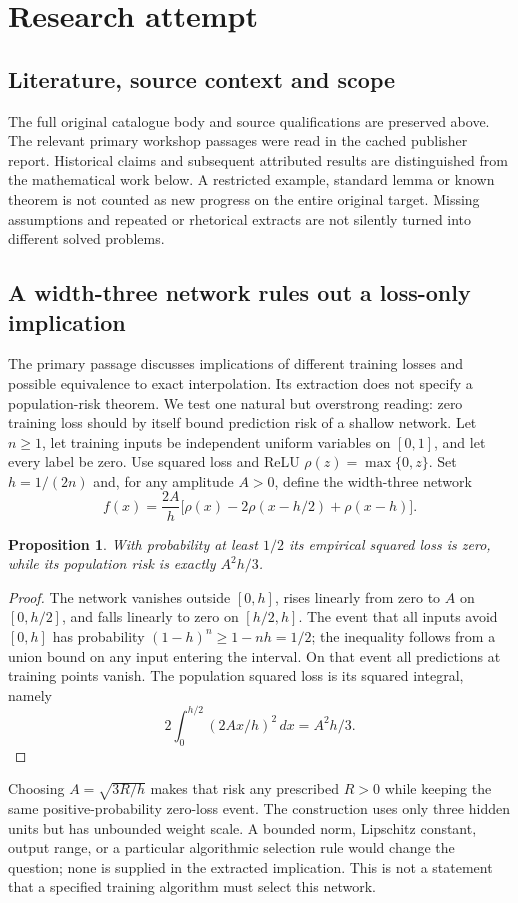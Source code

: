 \documentclass[11pt]{article}
\newtheorem{proposition}{Proposition}
\begin{document}
\section{Research attempt}
\subsection{Literature, source context and scope}
The full original catalogue body and source qualifications are preserved above. The relevant primary workshop passages were read in the cached publisher report. Historical claims and subsequent attributed results are distinguished from the mathematical work below. A restricted example, standard lemma or known theorem is not counted as new progress on the entire original target. Missing assumptions and repeated or rhetorical extracts are not silently turned into different solved problems.

\subsection{A width-three network rules out a loss-only implication}
The primary passage discusses implications of different training losses and possible equivalence to exact interpolation. Its extraction does not specify a population-risk theorem. We test one natural but overstrong reading: zero training loss should by itself bound prediction risk of a shallow network.
Let $n\ge1$, let training inputs be independent uniform variables on $[0,1]$, and let every label be zero. Use squared loss and ReLU $\rho(z)=\max\{0,z\}$. Set $h=1/(2n)$ and, for any amplitude $A>0$, define the width-three network
\[
f(x)=\frac{2A}{h}\big[\rho(x)-2\rho(x-h/2)+\rho(x-h)\big].
\]
\begin{proposition}
With probability at least $1/2$ its empirical squared loss is zero, while its population risk is exactly $A^2h/3$.
\end{proposition}
\begin{proof}
The network vanishes outside $[0,h]$, rises linearly from zero to $A$ on $[0,h/2]$, and falls linearly to zero on $[h/2,h]$. The event that all inputs avoid $[0,h]$ has probability $(1-h)^n\ge1-nh=1/2$; the inequality follows from a union bound on any input entering the interval. On that event all predictions at training points vanish. The population squared loss is its squared integral, namely
\[
2\int_0^{h/2}(2Ax/h)^2\,dx=A^2h/3.
\]
\end{proof}
Choosing $A=\sqrt{3R/h}$ makes that risk any prescribed $R>0$ while keeping the same positive-probability zero-loss event. The construction uses only three hidden units but has unbounded weight scale. A bounded norm, Lipschitz constant, output range, or a particular algorithmic selection rule would change the question; none is supplied in the extracted implication. This is not a statement that a specified training algorithm must select this network.
\end{document}
